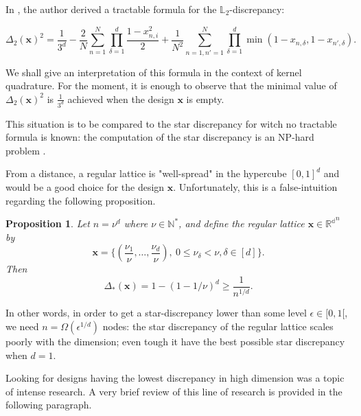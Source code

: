 \documentclass[twoside,11pt]{book}
\newtheorem{proposition}{Proposition}
\begin{document}
In \citep{War72}, the author derived a tractable formula for the $\mathbb{L}_{2}$-discrepancy:

\begin{equation}
\Delta_{2}(\bm{x})^{2} = \frac{1}{3^{d}} - \frac{2}{N} \sum\limits_{n = 1}^{N} \prod\limits_{\delta=1}^{d} \frac{1-x_{n,i}^{2}}{2} + \frac{1}{N^2} \sum\limits_{n=1,n'=1}^{N} \prod\limits_{\delta=1}^{d} \min(1-x_{n,\delta},1-x_{n',\delta}).
\end{equation}

We shall give an interpretation of this formula in the context of kernel quadrature. For the moment, it is enough to observe that the minimal value of $\displaystyle  \Delta_{2}(\bm{x})^{2}$ is $\displaystyle \frac{1}{3^{d}}$ achieved when the design $\bm{x}$ is empty.

This situation is to be compared to the star discrepancy for witch no tractable formula is known: the computation of the star discrepancy is an NP-hard problem \citep{GnSrWi09}.

From a distance, a regular lattice is "well-spread" in the hypercube $[0,1]^{d}$ and would be a good choice for the design $\bm{x}$. Unfortunately, this is a false-intuition regarding the following proposition. 

\begin{proposition}
Let $n = \nu^{d}$ where $\nu \in \mathbb{N}^{*}$, and define the regular lattice $\bm{x} \in \mathbb{R^{d}}^{n}$ by 
\begin{equation}
\bm{x} = \{ (\frac{\nu_{1}}{\nu}, \dots, \frac{\nu_{d}}{\nu}), \: 0 \leq \nu_{\delta} < \nu, \delta \in [d] \}. 
\end{equation}
Then
\begin{equation}
\Delta_{*}(\bm{x}) = 1- (1-1/\nu)^{d} \geq \frac{1}{n^{1/d}}. 
\end{equation} 
\end{proposition}

In other words, in order to get a star-discrepancy lower than some level $\epsilon \in [0,1[$, we need $n = \Omega(\epsilon^{1/d})$ nodes: the star discrepancy of the regular lattice scales poorly with the dimension; even tough it have the best possible star discrepancy when $d = 1$. 


Looking for designs having the lowest discrepancy in high dimension was a topic of intense research.  A very brief review of this line of research is provided in the following paragraph. 
\end{document}
